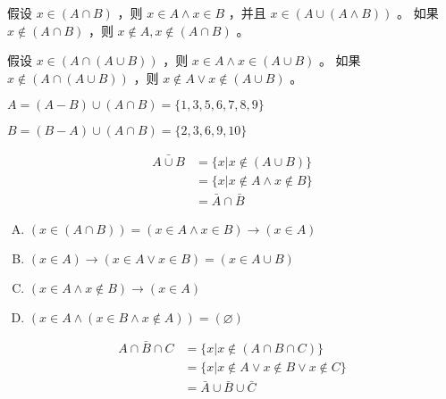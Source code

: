 {{        %
        \begin{practices}
            假设 $x \in (A \cap B)$ ，则 $x \in A \wedge x \in B$ ，并且 $x \in (A \cup (A \wedge B))$ 。
            如果 $x \notin (A \cap B)$ ，则 $x \notin A, x \notin (A \cap B)$ 。
        \end{practices}

        \begin{practices}
            假设 $x \in (A \cap (A \cup B))$ ，则 $x \in A \wedge x \in (A \cup B)$ 。
            如果 $x \notin (A \cap (A \cup B))$ ，则 $x \notin A \vee x \notin (A \cup B)$ 。
        \end{practices}

        \begin{practices}
            $A = (A - B) \cup (A \cap B) = \{1, 3, 5, 6, 7, 8, 9\}$

            $B = (B - A) \cup (A \cap B) = \{2, 3, 6, 9, 10\}$
        \end{practices}

        \begin{practices}
            \begin{align*}
                \bar{A \cup B}
                &= \{x | x \notin (A \cup B)\} \\
                &= \{x | x \notin A \wedge x \notin B\} \\
                &= \bar{A} \cap \bar{B}
            \end{align*}
        \end{practices}

        \begin{practices}
            \begin{enumerate}[A.]
                \item $(x \in (A \cap B)) = (x \in A \wedge x \in B) \rightarrow (x \in A)$
                \item $(x \in A) \rightarrow (x \in A \vee x \in B) = (x \in A \cup B)$
                \item $(x \in A \wedge x \notin B) \rightarrow (x \in A)$
                \item $(x \in A \wedge (x \in B \wedge x \notin A)) = (\varnothing)$
            \end{enumerate}
        \end{practices}

        \begin{practices}
            \begin{align*}
                \bar{A \cap B \cap C}
                &= \{x | x \notin (A \cap B \cap C)\} \\
                &= \{x | x \notin A \vee x \notin B \vee x \notin C\} \\
                &= \bar{A} \cup \bar{B} \cup \bar{C}
            \end{align*}
        \end{practices}

}}
